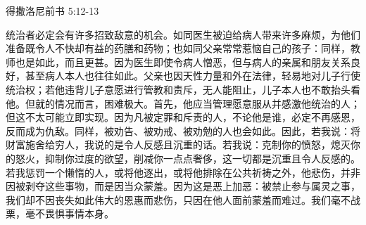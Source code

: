 得撒洛尼前书 5:12-13\par

\par

统治者必定会有许多招致敌意的机会。如同医生被迫给病人带来许多麻烦，为他们准备既令人不快却有益的药膳和药物；也如同父亲常常惹恼自己的孩子：同样，教师也是如此，而且更甚。因为医生即使令病人憎恶，但与病人的亲属和朋友关系良好，甚至病人本人也往往如此。父亲也因天性力量和外在法律，轻易地对儿子行使统治权；若他违背儿子意愿进行管教和责斥，无人能阻止，儿子本人也不敢抬头看他。但就的情况而言，困难极大。首先，他应当管理愿意服从并感激他统治的人；但这不太可能立即实现。因为凡被定罪和斥责的人，不论他是谁，必定不再感恩，反而成为仇敌。同样，被劝告、被劝戒、被劝勉的人也会如此。因此，若我说：将财富施舍给穷人，我说的是令人反感且沉重的话。若我说：克制你的愤怒，熄灭你的怒火，抑制你过度的欲望，削减你一点点奢侈，这一切都是沉重且令人反感的。若我惩罚一个懒惰的人，或将他逐出，或将他排除在公共祈祷之外，他悲伤，并非因被剥夺这些事物，而是因当众蒙羞。因为这是恶上加恶：被禁止参与属灵之事，我们却不因丧失如此伟大的恩惠而悲伤，只因在他人面前蒙羞而难过。我们毫不战栗，毫不畏惧事情本身。\par

